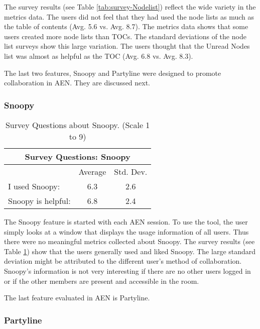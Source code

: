 The survey results (see Table \ref{tab:survey-Nodelist}) reflect the wide
variety in the metrics data.  The users did not feel that they had used the
node lists as much as the table of contents (Avg. 5.6 vs. Avg. 8.7).  The
metrics data shows that some users created more node lists than TOCs.  The
standard deviations of the node list surveys show this large variation.
The users thought that the Unread Nodes list was almost as helpful as the
TOC (Avg. 6.8 vs. Avg. 8.3).



The last two features, Snoopy and Partyline were designed to promote
collaboration in AEN.  They are discussed next.

\subsubsection{Snoopy}

\small
\begin{table}[htbp]
  \caption{Survey Questions about Snoopy. (Scale 1 to 9)}
  \begin{center}
    \begin{tabular}{|l|c|c|}
      \hline
      \multicolumn{3}{|c|}{\rule[-3mm]{0mm}{8mm}\bf Survey Questions:
      Snoopy}\\ \hline
      &Average&Std. Dev.\\ \hline
      I used Snoopy:&6.3&2.6\\\hline
      Snoopy is helpful:&6.8&2.4\\\hline
    \end{tabular}
  \end{center}
  \label{tab:survey-Snoopy}
\end{table}
\normalsize

The Snoopy feature is started with each AEN session.  To use the tool, the
user simply looks at a window that displays the usage information of all
users.  Thus there were no meaningful metrics collected about Snoopy.  The
survey results (see Table \ref{tab:survey-Snoopy}) show that the users
generally used and liked Snoopy.  The large standard deviation might be
attributed to the different user's method of collaboration.  Snoopy's
information is not very interesting if there are no other users logged in
or if the other members are present and accessible in the room.


The last feature evaluated in AEN is Partyline.
\subsubsection{Partyline} 


